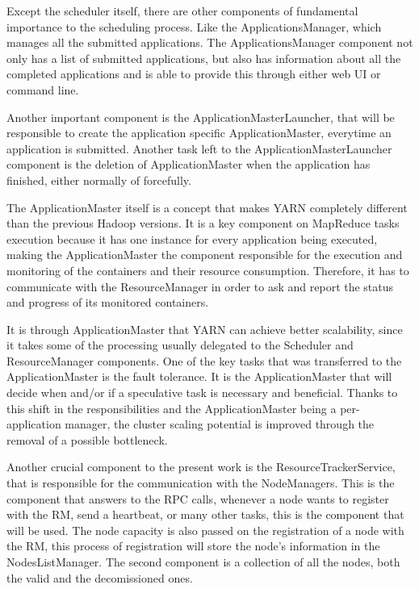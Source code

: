 Except the scheduler itself, there are other components of fundamental importance to the scheduling process. Like the ApplicationsManager, which manages all the submitted applications. The ApplicationsManager component not only has a list of submitted applications, but also has information about all the completed applications and is able to provide this through either web UI or command line.

Another important component is the ApplicationMasterLauncher, that will be responsible to create the application specific ApplicationMaster, everytime an application is submitted. Another task left to the ApplicationMasterLauncher component is the deletion of ApplicationMaster when the application has finished, either normally of forcefully.

The ApplicationMaster itself is a concept that makes YARN completely different than the previous Hadoop versions. It is a key component on MapReduce tasks execution because it has one instance for every application being executed, making the ApplicationMaster the component responsible for the execution and monitoring of the containers and their resource consumption. Therefore, it has to communicate with the ResourceManager in order to ask and report the status and progress of its monitored containers.

It is through ApplicationMaster that YARN can achieve better scalability, since it takes some of the processing usually delegated to the Scheduler and ResourceManager components. One of the key tasks that was transferred to the ApplicationMaster is the fault tolerance. It is the ApplicationMaster that will decide when and/or if a speculative task is necessary and beneficial. Thanks to this shift in the responsibilities and the ApplicationMaster being a per-application manager, the cluster scaling potential is improved through the removal of a possible bottleneck. 

Another crucial component to the present work is the ResourceTrackerService, that is responsible for the communication with the NodeManagers. This is the component that answers to the RPC calls, whenever a node wants to register with the RM, send a heartbeat, or many other tasks, this is the component that will be used. The node capacity is also passed on the registration of a node with the RM, this process of registration will store the node's information in the NodesListManager. The second component is a collection of all the nodes, both the valid and the decomissioned ones.

